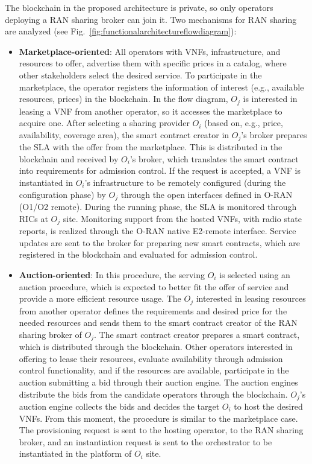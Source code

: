 \documentclass[journal]{IEEEtran}
\begin{document}
	The blockchain in the proposed architecture is private, so only operators deploying a RAN sharing broker can join it. Two mechanisms for RAN sharing are analyzed (see Fig.~\ref{fig:functionalarchitectureflowdiagram}):
	\begin{itemize}
		\item \textbf{Marketplace-oriented}: All operators with VNFs, infrastructure, and resources to offer, advertise them with specific prices in a catalog, where other stakeholders select the desired service. To participate in the marketplace, the operator registers the information of interest (e.g., available resources, prices) in the blockchain. In the flow diagram, $O_j$ is interested in leasing a VNF from another operator, so it accesses the marketplace to acquire one. After selecting a sharing provider $O_i$ (based on, e.g., price, availability, coverage area), the smart contract creator in $O_j$'s broker prepares the SLA with the offer from the marketplace. This is distributed in the blockchain and received by $O_i$'s broker, which translates the smart contract into requirements for admission control. If the request is accepted, a VNF is instantiated in $O_i$'s infrastructure to be remotely configured (during the configuration phase) by $O_j$ through the open interfaces defined in O-RAN (O1/O2 remote). During the running phase, the SLA is monitored through RICs at $O_j$ site. Monitoring support from the hosted VNFs, with radio state reports, is realized through the O-RAN native E2-remote interface. Service updates are sent to the broker for preparing new smart contracts, which are registered in the blockchain and evaluated for admission control.
		\item \textbf{Auction-oriented}: In this procedure, the serving $O_i$ is selected using an auction procedure, which is expected to better fit the offer of service and provide a more efficient resource usage. The $O_j$ interested in leasing resources from another operator defines the requirements and desired price for the needed resources and sends them to the smart contract creator of the RAN sharing broker of $O_j$. The smart contract creator prepares a smart contract, which is distributed through the blockchain. Other operators interested in offering to lease their resources, evaluate availability through admission control functionality, and if the resources are available, participate in the auction submitting a bid through their auction engine. The auction engines distribute the bids from the candidate operators through the blockchain. $O_j$'s auction engine collects the bids and decides the target $O_i$ to host the desired VNFs. From this moment, the procedure is similar to the marketplace case. The provisioning request is sent to the hosting operator, to the RAN sharing broker, and an instantiation request is sent to the orchestrator to be instantiated in the platform of $O_i$ site. 
	\end{itemize}
	
\end{document}
